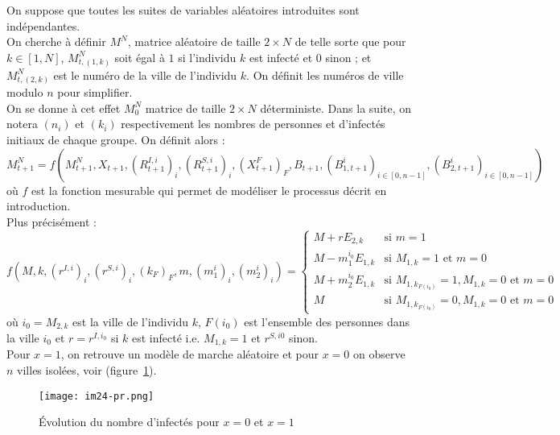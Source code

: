 \documentclass[a4paper,10.9pt]{article}
\begin{document}
On suppose que toutes les suites de variables aléatoires introduites sont indépendantes. \\

On cherche à définir $M^N$, matrice aléatoire de taille $2 \times N$ de telle sorte que pour $k \in [1,N]$, $M^N_{t,(1,k)}$ soit égal à $1$ si l'individu $k$ est infecté et $0$ sinon ; et $M^N_{t,(2,k)}$ est le numéro de la ville de l'individu $k$. On définit les numéros de ville modulo $n$ pour simplifier. \\ 

On se donne à cet effet $M^N_0$ matrice de taille $2 \times N$ déterministe. Dans la suite, on notera $(n_i)$ et $(k_i)$ respectivement les nombres de personnes et d'infectés initiaux de chaque groupe. On définit alors :
$$M^{N}_{t+1}=f(M^N_{t+1},X_{t+1},(R^{I,i}_{t+1})_i,(R^{S,i}_{t+1})_i,(X^F_{t+1})_F,B_{t+1},(B^i_{1,t+1})_{i \in [0,n-1]},(B^i_{2,t+1})_{i \in [0,n-1]})$$
où $f$ est la fonction mesurable qui permet de modéliser le processus décrit en introduction. \\

Plus précisément : \\

$f(M,k,(r^{I,i})_i,(r^{S,i})_i,(k_F)_{F},m,(m^i_1)_{i}, (m^i_2)_{i}) =
\left\{
\begin{array}{ll}
    M + rE_{2,k} & \text{si } m = 1 \\
    M - m^{i_0}_{1} E_{1,k} & \text{si } M_{1,k} = 1 \text{ et } m = 0 \\
    M + m^{i_0}_{2}E_{1,k} & \text{si } M_{1,k_{F(i_0)}} = 1, M_{1,k} = 0 \text{ et } m = 0 \\
    M & \text{si } M_{1,k_{F(i_0)}} = 0, M_{1,k} = 0 \text{ et } m = 0
\end{array}
\right.$\\
où $i_0=M_{2,k}$ est la ville de l'individu $k$, $F(i_0)$ est l'ensemble des personnes dans la ville $i_0$ et $r=r^{I,i_0}$ si $k$ est infecté i.e. $M_{1,k}=1$ et $r^{S,i0}$ sinon. \\

Pour $x=1$, on retrouve un modèle de marche aléatoire et pour $x=0$ on observe $n$ villes isolées, voir (figure~\ref{fig:nb_inf_x}).

\begin{figure}[h]
    \centering
    \texttt{[image: im24-pr.png]}
    \caption{Évolution du nombre d'infectés pour $x=0$ et $x=1$}
    \label{fig:nb_inf_x}
\end{figure}
\end{document}
